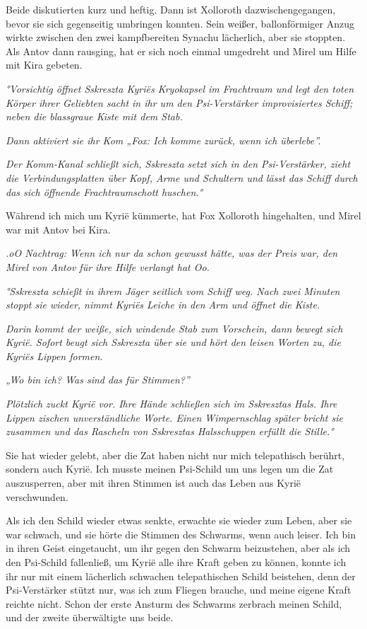 \documentclass[11pt]{article}
\begin{document}
Beide diskutierten kurz und heftig. Dann ist Xolloroth
dazwischengegangen, bevor sie sich gegenseitig umbringen konnten. Sein
weißer, ballonförmiger Anzug wirkte zwischen den zwei kampfbereiten
Synachu lächerlich, aber sie stoppten. Als Antov dann rausging, hat er
sich noch einmal umgedreht und Mirel um Hilfe mit Kira gebeten.

\emph{°Vorsichtig öffnet Sskreszta Kyriës Kryokapsel im Frachtraum und
legt den toten Körper ihrer Geliebten sacht in ihr um den Psi-Verstärker
improvisiertes Schiff; neben die blassgraue Kiste mit dem Stab.}

\emph{Dann aktiviert sie ihr Kom „Fox: Ich komme zurück, wenn ich
überlebe''.}

\emph{Der Komm-Kanal schließt sich, Sskreszta setzt sich in den
Psi-Verstärker, zieht die Verbindungsplatten über Kopf, Arme und
Schultern und lässt das Schiff durch das sich öffnende Frachtraumschott
huschen.°}

Während ich mich um Kyrië kümmerte, hat Fox Xolloroth hingehalten, und
Mirel war mit Antov bei Kira.

\emph{.oO Nachtrag: Wenn ich nur da schon gewusst hätte, was der Preis
war, den Mirel von Antov für ihre Hilfe verlangt hat Oo.}

\emph{°Sskreszta schießt in ihrem Jäger seitlich vom Schiff weg. Nach
zwei Minuten stoppt sie wieder, nimmt Kyriës Leiche in den Arm und
öffnet die Kiste.}

\emph{Darin kommt der weiße, sich windende Stab zum Vorschein, dann
bewegt sich Kyrië. Sofort beugt sich Sskreszta über sie und hört den
leisen Worten zu, die Kyriës Lippen formen.}

\emph{„Wo bin ich? Was sind das für Stimmen?''}

\emph{Plötzlich zuckt Kyrië vor. Ihre Hände schließen sich im Sskresztas
Hals. Ihre Lippen zischen unverständliche Worte. Einen Wimpernschlag
später bricht sie zusammen und das Rascheln von Sskresztas Halsschuppen
erfüllt die Stille.°}

Sie hat wieder gelebt, aber die Zat haben nicht nur mich telepathisch
berührt, sondern auch Kyrië. Ich musste meinen Psi-Schild um uns legen
um die Zat auszusperren, aber mit ihren Stimmen ist auch das Leben aus
Kyrië verschwunden.

Als ich den Schild wieder etwas senkte, erwachte sie wieder zum Leben,
aber sie war schwach, und sie hörte die Stimmen des Schwarms, wenn auch
leiser. Ich bin in ihren Geist eingetaucht, um ihr gegen den Schwarm
beizustehen, aber als ich den Psi-Schild fallenließ, um Kyrië alle ihre
Kraft geben zu können, konnte ich ihr nur mit einem lächerlich schwachen
telepathischen Schild beistehen, denn der Psi-Verstärker stützt nur, was
ich zum Fliegen brauche, und meine eigene Kraft reichte nicht. Schon der
erste Ansturm des Schwarms zerbrach meinen Schild, und der zweite
überwältigte uns beide.
\end{document}
